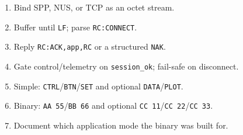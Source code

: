 \documentclass[12pt,a4paper]{article}
\begin{document}
\begin{enumerate}[leftmargin=1.6cm]
  \item Bind SPP, NUS, or TCP as an octet stream.
  \item Buffer until \texttt{LF}; parse \texttt{RC:CONNECT}.
  \item Reply \texttt{RC:ACK,app,RC} or a structured \texttt{NAK}.
  \item Gate control/telemetry on \texttt{session\_ok}; fail-safe on disconnect.
  \item Simple: \texttt{CTRL}/\texttt{BTN}/\texttt{SET} and optional
        \texttt{DATA}/\texttt{PLOT}.
  \item Binary: \texttt{AA 55}/\texttt{BB 66} and optional
        \texttt{CC 11}/\texttt{CC 22}/\texttt{CC 33}.
  \item Document which application mode the binary was built for.
\end{enumerate}
\end{document}
